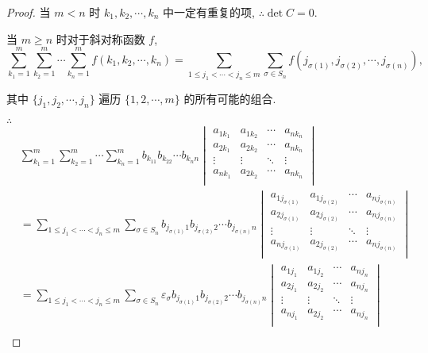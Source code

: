 \documentclass{ctexart}
\begin{document}
\begin{proof}
    当 $m<n$ 时 $k_1,k_2,\cdots,k_n$ 中一定有重复的项, $\therefore\det C=0$.

    当 $m\geq n$ 时对于斜对称函数 $f$,
    \[\sum_{k_1=1}^m\sum_{k_2=1}^m\cdots\sum_{k_n=1}^mf(k_1,k_2,\cdots,k_n)=\sum\limits_{1\leq j_1<\cdots<j_n\leq m}\sum_{\sigma\in S_n}f(j_{\sigma(1)},j_{\sigma(2)},\cdots,j_{\sigma(n)}),\]

    其中 $\{j_1,j_2,\cdots,j_n\}$ 遍历 $\{1,2,\cdots,m\}$ 的所有可能的组合.

    $\therefore$
    \begin{align*}
        & \sum_{k_1=1}^m\sum_{k_2=1}^m\cdots\sum_{k_n=1}^mb_{k_11}b_{k_22}\cdots b_{k_nn}\begin{vmatrix}
            a_{1k_1} & a_{1k_2} & \cdots & a_{nk_n} \\
            a_{2k_1} & a_{2k_2} & \cdots & a_{nk_n} \\
            \vdots & \vdots & \ddots & \vdots \\
            a_{nk_1} & a_{2k_2} & \cdots & a_{nk_n} \\
        \end{vmatrix} \\
        & =\sum\limits_{1\leq j_1<\cdots<j_n\leq m}\sum_{\sigma\in S_n}b_{j_{\sigma(1)}1}b_{j_{\sigma(2)}2}\cdots b_{j_{\sigma(n)}n}\begin{vmatrix}
            a_{1j_{\sigma(1)}} & a_{1j_{\sigma(2)}} & \cdots & a_{nj_{\sigma(n)}} \\
            a_{2j_{\sigma(1)}} & a_{2j_{\sigma(2)}} & \cdots & a_{nj_{\sigma(n)}} \\
            \vdots & \vdots & \ddots & \vdots \\
            a_{nj_{\sigma(1)}} & a_{2j_{\sigma(2)}} & \cdots & a_{nj_{\sigma(n)}} \\
        \end{vmatrix} \\
        & =\sum\limits_{1\leq j_1<\cdots<j_n\leq m}\sum_{\sigma\in S_n}\varepsilon_\sigma b_{j_{\sigma(1)}1}b_{j_{\sigma(2)}2}\cdots b_{j_{\sigma(n)}n}\begin{vmatrix}
            a_{1j_1} & a_{1j_2} & \cdots & a_{nj_n} \\
            a_{2j_1} & a_{2j_2} & \cdots & a_{nj_n} \\
            \vdots & \vdots & \ddots & \vdots \\
            a_{nj_1} & a_{2j_2} & \cdots & a_{nj_n} \\
        \end{vmatrix} \\

\end{align*}
\end{proof}
\end{document}
